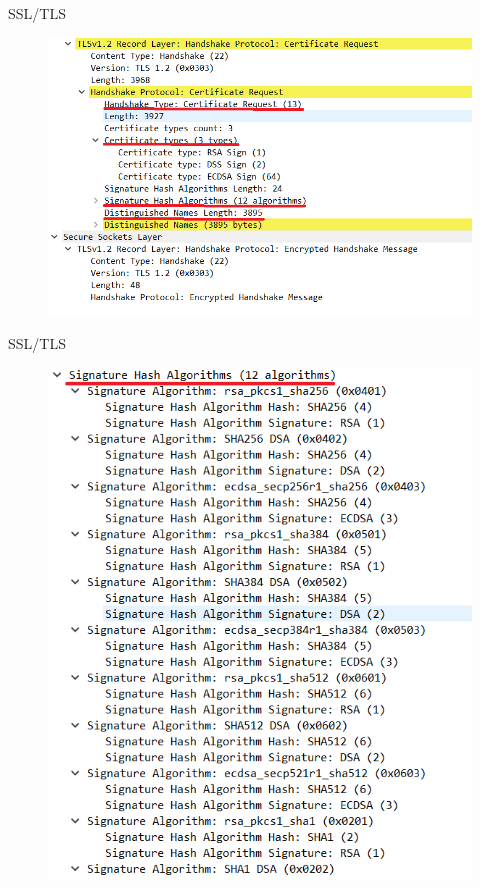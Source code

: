 \documentclass[pdf]{beamer}
\begin{document}
\begin{frame}{SSL/TLS}

\begin{figure}[t]
\centering
\includegraphics[scale=0.6]{Images/tls5a}
\end{figure}

\end{frame}



\begin{frame}{SSL/TLS}

\begin{figure}[t]
\centering
\includegraphics[scale=0.5]{Images/tls5b}
\end{figure}

\end{frame}
\end{document}
